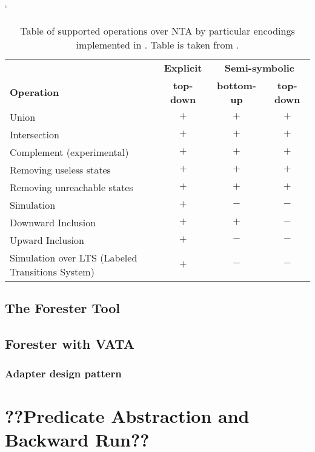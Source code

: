 \begin{table}[bt]
	\begin{center}
		\catcode`
		\begin{tabular}{| l | c | c | c |} \hline
		& {\textbf{Explicit}} & \multicolumn{2}{|c|}{\textbf{Semi-symbolic}} \\ \cline{2-4}
		\textbf{Operation} & \textbf{top-down} & \textbf{bottom-up} & \textbf{top-down} \\ \hline
		Union & $+$ & $+$ & $+$ \\
		Intersection & $+$ & $+$ & $+$ \\
		Complement (experimental) & $+$ & $+$ & $+$ \\
		Removing useless states & $+$ & $+$ & $+$ \\
		Removing unreachable states & $+$ & $+$ & $+$ \\
		Simulation & $+$ & $-$ & $-$ \\
		Downward Inclusion  & $+$ & $+$ & $-$ \\ 
		Upward Inclusion  & $+$ & $-$ & $-$ \\ 
		Simulation over LTS (Labeled Transitions System) & $+$ & $-$ & $-$ \\ \hline
		\end{tabular}
	\caption{Table of supported operations over NTA by particular encodings implemented in \vata.
	Table is taken from \cite{hruska13}.}
	\label{tab:vataop}
	\end{center}
\end{table}


\section{The Forester Tool}
\label{sec:FA}


\section{Forester with VATA}
\label{sec:fova}

\subsection{Adapter design pattern}

\chapter{??Predicate Abstraction and Backward Run??}
\label{ch:pred}

